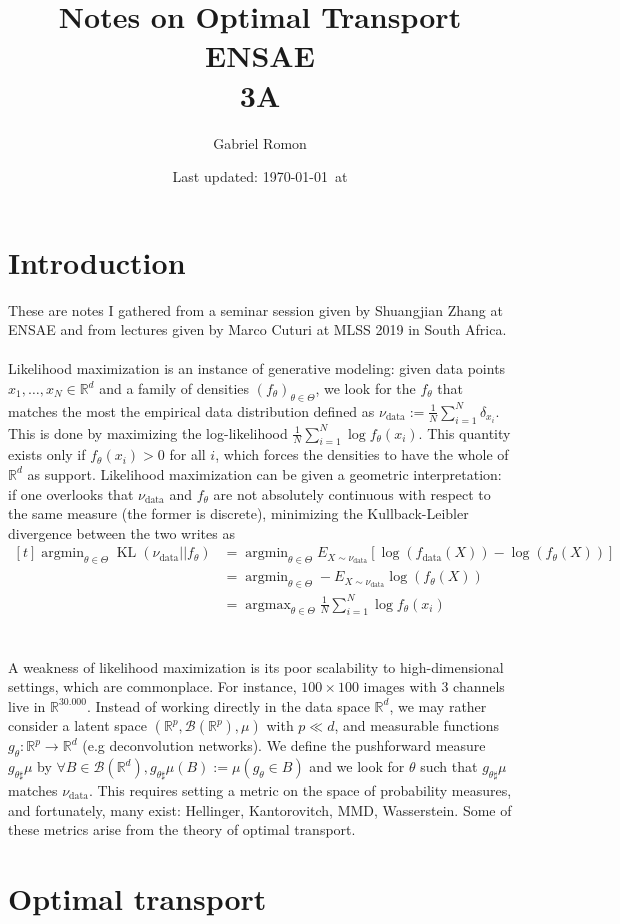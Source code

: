 \documentclass{article}
\title{Notes on Optimal Transport\\ ENSAE\\ 3A}
\author{Gabriel Romon}
\date{Last updated: \today \, at \currenttime}
\theoremstyle{definition}
\theoremstyle{remark}
\DeclareMathOperator{\argmin}{argmin}
\DeclareMathOperator{\argmax}{argmax}
\DeclareMathOperator{\kl}{KL}
\DeclareMathOperator{\data}{data}
\begin{document}
\maketitle

\section{Introduction}

These are notes I gathered from a seminar session given by Shuangjian Zhang at ENSAE and from lectures given by Marco Cuturi at MLSS 2019 in South Africa. 
\\\\
Likelihood maximization is an instance of generative modeling: given data points $x_1,\ldots,x_N\in \mathbb R^d$ and a family of densities $(f_\theta)_{\theta \in \Theta}$, we look for the $f_\theta$ that matches the most the empirical data distribution defined as $\nu_{\data}:=\frac 1N \sum_{i=1}^N \delta_{x_i}$. This is done by maximizing the log-likelihood $\frac 1N \sum_{i=1}^N \log f_\theta(x_i)$. This quantity exists only if $f_\theta(x_i)>0$ for all $i$, which forces the densities to have the whole of $\mathbb R^d$ as support. Likelihood maximization can be given a geometric interpretation: if one overlooks that $\nu_{\data}$ and $f_\theta$ are not absolutely continuous with respect to the same measure (the former is discrete), minimizing the Kullback-Leibler divergence between the two writes as $\begin{aligned}[t]\argmin_{\theta\in \Theta} \kl(\nu_{\data}||f_\theta) &= \argmin_{\theta\in \Theta} E_{X\sim \nu_{\data}}[\log(f_{\data}(X))-\log(f_\theta(X))]\\
&= \argmin_{\theta\in \Theta} -E_{X\sim \nu_{\data}}\log(f_\theta(X))\\
&= \argmax_{\theta\in \Theta} \frac 1N \sum_{i=1}^N \log f_\theta(x_i)
\end{aligned}$
\\\\\\
A weakness of likelihood maximization is its poor scalability to high-dimensional settings, which are commonplace. For instance, $100\times 100$ images with 3 channels live in $\mathbb R^{30.000}$. Instead of working directly in the data space $\mathbb R^d$, we may rather consider a latent space $(\mathbb R^p, \mathcal B(\mathbb R^p), \mu)$ with $p\ll d$, and measurable functions $g_\theta:\mathbb R^p\to \mathbb R^d$ (e.g deconvolution networks). We define the pushforward measure $g_{\theta \sharp}\mu$ by $\forall B\in \mathcal B(\mathbb R^d), g_{\theta \sharp}\mu(B) := \mu(g_{\theta} \in B)$ and we look for $\theta$ such that $g_{\theta \sharp}\mu$ matches $\nu_{\data}$. This requires setting a metric on the space of probability measures, and fortunately, many exist: Hellinger, Kantorovitch, MMD, Wasserstein. Some of these metrics arise from the theory of optimal transport.

\section{Optimal transport}
\end{document}
